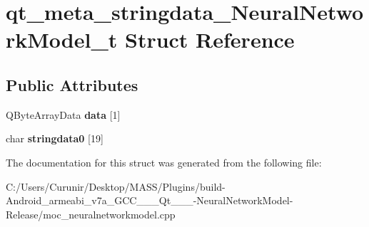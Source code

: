 \hypertarget{structqt__meta__stringdata___neural_network_model__t}{}\section{qt\+\_\+meta\+\_\+stringdata\+\_\+\+Neural\+Network\+Model\+\_\+t Struct Reference}
\label{structqt__meta__stringdata___neural_network_model__t}
\subsection*{Public Attributes}
\begin{DoxyCompactItemize}
\item 
\mbox{\label{structqt__meta__stringdata___neural_network_model__t_ad67b589f2fc0dd7a5024e2f39f4b0069}} 
Q\+Byte\+Array\+Data {\bfseries data} \mbox{[}1\mbox{]}
\item 
\mbox{\label{structqt__meta__stringdata___neural_network_model__t_a04ae02dd20e2bd4028befac50f333239}} 
char {\bfseries stringdata0} \mbox{[}19\mbox{]}
\end{DoxyCompactItemize}


The documentation for this struct was generated from the following file\+:\begin{DoxyCompactItemize}
\item 
C\+:/\+Users/\+Curunir/\+Desktop/\+M\+A\+S\+S/\+Plugins/build-\/\+Android\+\_\+armeabi\+\_\+v7a\+\_\+\+G\+C\+C\+\_\+\_\+\_\+\+Qt\+\_\+\_\+\_-\/\+Neural\+Network\+Model-\/\+Release/moc\+\_\+neuralnetworkmodel.\+cpp\end{DoxyCompactItemize}
